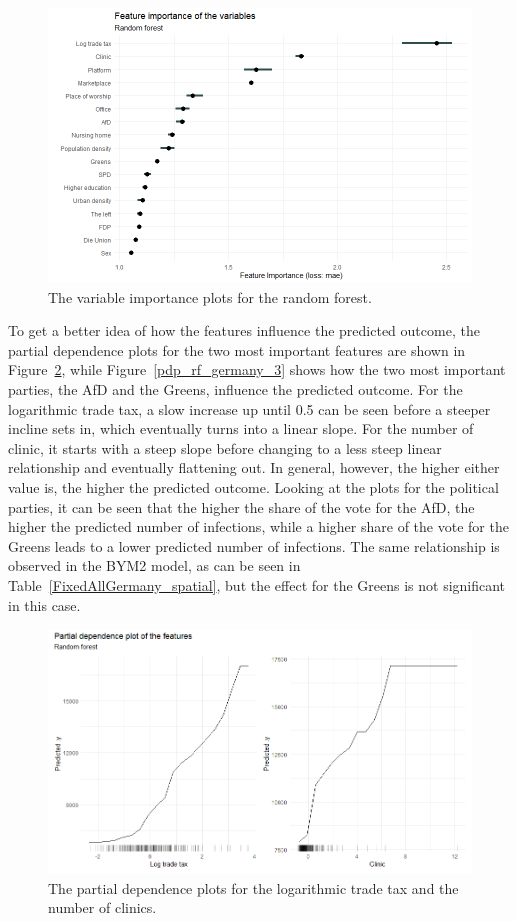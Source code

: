 \begin{figure}[H]
  \centering
  \includegraphics[width = \textwidth]{importance_rf_germany.png}
  \caption{The variable importance plots for the random forest.}
  \label{importance_rf_germany}
\end{figure}
To get a better idea of how the features influence the predicted outcome, the partial dependence plots for the two most important features are shown in Figure~\ref{pdp_rf_germany_1}, while Figure~\ref{pdp_rf_germany_3} shows how the two most important parties, the AfD and the Greens, influence the predicted outcome. For the logarithmic trade tax, a slow increase up until 0.5 can be seen before a steeper incline sets in, which eventually turns into a linear slope. For the number of clinic, it starts with a steep slope before changing to a less steep linear relationship and eventually flattening out. In general, however, the higher either value is, the higher the predicted outcome. Looking at the plots for the political parties, it can be seen that the higher the share of the vote for the AfD, the higher the predicted number of infections, while a higher share of the vote for the Greens leads to a lower predicted number of infections. The same relationship is observed in the BYM2 model, as can be seen in Table~\ref{FixedAllGermany_spatial}, but the effect for the Greens is not significant in this case. \clearpage
\begin{figure}[H]
  \centering
  \includegraphics[width = \textwidth]{pdp_rf_germany_1.png}
  \caption{The partial dependence plots for the logarithmic trade tax and the number of clinics.}
  \label{pdp_rf_germany_1}
\end{figure}
